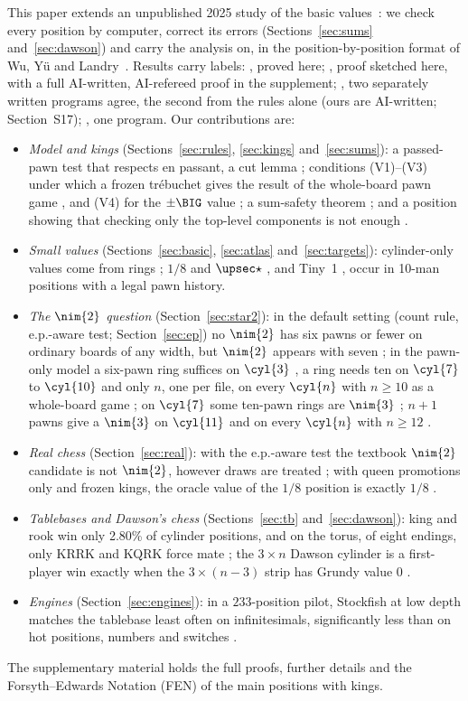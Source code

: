 This paper extends an unpublished 2025 study of the basic values\bytheauthor~\cite{Study2025}: we check
every position by computer, correct its errors (Sections~\ref{sec:sums} and~\ref{sec:dawson}) and carry
the analysis on, in the position-by-position format of Wu, Y\"u and Landry~\cite{WuYuLandry2010}. Results carry
labels: , proved here; , proof sketched here, with a full AI-written, AI-refereed proof in the supplement;
, two separately written programs agree, the second from the rules alone (ours are AI-written; Section~S17); , one
program. Our contributions are:
\begin{itemize}
\item \emph{Model and kings} (Sections~\ref{sec:rules}, \ref{sec:kings} and~\ref{sec:sums}): a passed-pawn
  test that respects en passant, a cut lemma ; conditions (V1)--(V3) under which a frozen tr\'ebuchet gives
  the result of the whole-board pawn game , and (V4) for the $\pm\BIG$ value ; a sum-safety
  theorem ; and a position showing that checking only the top-level components is not enough .
\item \emph{Small values} (Sections~\ref{sec:basic}, \ref{sec:atlas} and~\ref{sec:targets}): cylinder-only values come from rings
  ; $1/8$ and $\upsec\star$ , and Tiny~1 , occur in 10-man positions with a legal pawn
  history.
\item \emph{The $\nim{2}$ question} (Section~\ref{sec:star2}): in the default setting (count rule, e.p.-aware test; Section~\ref{sec:ep}) no $\nim{2}$ has six
  pawns or fewer on ordinary boards of any width, but $\nim{2}$ appears with seven ; in the pawn-only
  model a six-pawn ring suffices on $\cyl{3}$ , a ring needs ten on $\cyl{7}$ to $\cyl{10}$ 
  and only $n$, one per file, on every $\cyl{n}$ with $n\ge10$ as a whole-board game ; on $\cyl{7}$
  some ten-pawn rings are $\nim{3}$ ; $n+1$ pawns give a $\nim{3}$ on $\cyl{11}$  and on every $\cyl{n}$ with $n\ge12$ .
\item \emph{Real chess} (Section~\ref{sec:real}): with the e.p.-aware test the textbook $\nim{2}$ candidate is not $\nim{2}$, however
  draws are treated ; with queen promotions only and frozen kings, the oracle value of the $1/8$ position is
  exactly $1/8$ .
\item \emph{Tablebases and Dawson's chess} (Sections~\ref{sec:tb} and~\ref{sec:dawson}): king and rook win only
  2.80\% of cylinder positions, and on the torus, of eight endings, only KRRK and KQRK force mate ; the
  $3\times n$ Dawson cylinder is a first-player win exactly when the $3\times(n-3)$ strip has Grundy value $0$
  .
\item \emph{Engines} (Section~\ref{sec:engines}): in a $233$-position pilot, Stockfish at low depth matches the tablebase least
  often on infinitesimals, significantly less than on hot positions, numbers and switches .
\end{itemize}
The supplementary material holds the full proofs, further details and the Forsyth--Edwards Notation (FEN) of
the main positions with kings.
